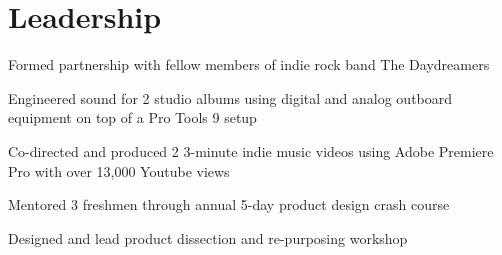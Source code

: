 \documentclass[letterpaper]{deedy-resume} %
\begin{document}
\begin{minipage}[t]{0.66\textwidth}
\section{Leadership}


\begin{tightitemize}
  \item Formed partnership with fellow members of indie rock band The Daydreamers
  \item Engineered sound for 2 studio albums using digital and analog outboard equipment on top of a Pro Tools 9 setup
  \item Co-directed and produced 2 3-minute indie music videos using Adobe Premiere Pro with over 13,000 Youtube views
\end{tightitemize}

\sectionspace %







\begin{tightitemize}
  \item Mentored 3 freshmen through annual 5-day product design crash course
  \item Designed and lead product dissection and re-purposing workshop
\end{tightitemize}


\end{minipage}
\end{document}
